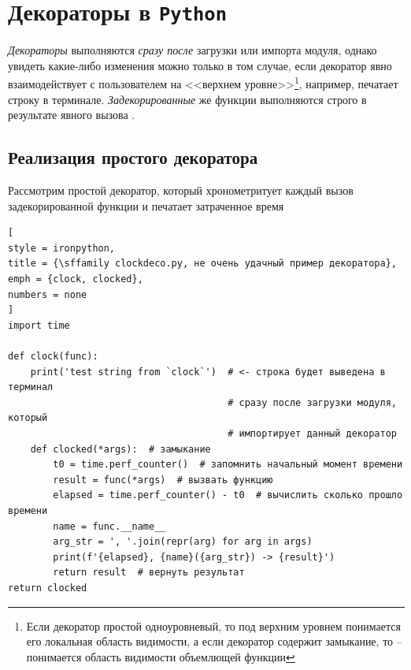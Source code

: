 \documentclass[%
	11pt,
	a4paper,
	utf8,
		]{article}
\begin{document}

\section{Декораторы в \texttt{Python}}

\emph{Декораторы} выполняются \emph{сразу после} загрузки или импорта модуля, однако увидеть какие-либо изменения можно только в том случае, если декоратор явно взаимодействует с пользователем на <<верхнем уровне>>\footnote{Если декоратор простой одноуровневый, то под верхним уровнем понимается его локальная область видимости, а если декоратор содержит замыкание, то -- понимается область видимости объемлющей функции}, например, печатает строку в терминале.  \emph{Задекорированные} же { функции} выполняются строго в результате явного вызова \cite[]{ramalho:python-2016}.

\subsection{Реализация простого декоратора}

Рассмотрим простой декоратор, который хронометритует каждый вызов задекорированной функции и печатает затраченное время

\begin{lstlisting}[
style = ironpython,
title = {\sffamily clockdeco.py, не очень удачный пример декоратора},
emph = {clock, clocked},
numbers = none
]
import time

def clock(func):
    print('test string from `clock`')  # <- строка будет выведена в терминал
                                       # сразу после загрузки модуля, который
                                       # импортирует данный декоратор
    def clocked(*args):  # замыкание
        t0 = time.perf_counter()  # запомнить начальный момент времени
        result = func(*args)  # вызвать функцию
        elapsed = time.perf_counter() - t0  # вычислить сколько прошло времени
        name = func.__name__
        arg_str = ', '.join(repr(arg) for arg in args)
        print(f'{elapsed}, {name}({arg_str}) -> {result}')
        return result  # вернуть результат
return clocked
\end{lstlisting}
\end{document}
